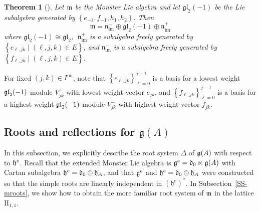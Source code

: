 \documentclass[11pt,letterpaper]{amsart}
\newcounter{thecounter}
\numberwithin{thecounter}{section}
\newtheorem{theorem}[thecounter]{Theorem}
\theoremstyle{definition}
\DeclareMathOperator{\re}{{re}}
\DeclareMathOperator{\im}{{im}}
\newcommand{\nimp}{{\mathfrak{n}_{\im}^+}}
\newcommand{\nimm}{{\mathfrak{n}_{\im}^-}}
\begin{document}
\begin{theorem}[\cite{JurJPAA}]\label{T-m-free}
Let $\frak m$ be the Monster Lie algebra and 
let $\mathfrak{gl}_2(-1)$ be the Lie subalgebra generated by $\left\{e_{-1}, f_{-1}, h_{1}, h_2 \right\}$. Then
$$\mathfrak{m} = \nimm \oplus \mathfrak{gl}_2(-1)  \oplus \nimp$$
where
$\mathfrak{gl}_2(-1) %
\cong \mathfrak{gl}_2$,  $\;\nimp$ is a subalgebra freely generated by  $\left\{e_{\ell,jk}\mid (\ell,j,k)\in E \right\}$,  and
$\nimm$ is a subalgebra freely generated by  $\left\{f_{\ell,jk}\mid (\ell,j,k)\in E \right\}$.
\end{theorem}
%


For fixed $(j,k)\in I^{\im}$,  note that $\left\{e_{\ell,jk}\right\}_{\ell=0}^{j-1}$ is a basis for a lowest weight $\frak{gl}_2(-1)$-module $V_{jk}^+$ with lowest weight vector $e_{jk}$,  and $\left\{f_{\ell,jk}\right\}_{\ell=0}^{j-1}$ is a basis for a 
highest weight $\frak{gl}_2(-1)$-module $V_{jk}^-$ with highest weight vector $f_{jk}$.



\subsection{Roots and reflections for ${\mathfrak g}(A)$}\label{SS-gAeroots}
In this subsection, we explicitly describe the root system $\Delta$ of ${\frak g}(A)$ with respect to $\frak h^e$.
Recall that the extended Monster Lie algebra is $\frak g^e=\mathfrak{d}_0 \ltimes \mathfrak{g}(A)$
with Cartan subalgebra $\frak h^e=\frak d_0 \oplus \frak h_A$, and that $\frak g^e$ and $\frak h^e=\frak d_0 \oplus \frak h_A$ were constructed so that the simple roots are linearly independent in $(\mathfrak{h}^e)^*$. In Subsection~\ref{SS-mroots}, we show
 how to obtain the more familiar root system of $\frak m$ in the  lattice $\text{II}_{1,1}$.
\end{document}
